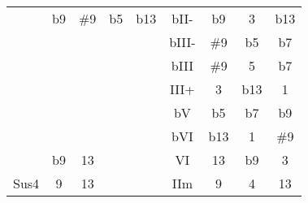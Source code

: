 \documentclass[10pt,a4paper]{article}
\begin{document}
\begin{table}[]
\begin{tabular}{ccccccccc}
\multicolumn{1}{|c|}{}                                 & \multicolumn{1}{c|}{b9} & \multicolumn{1}{c|}{\#9}  & \multicolumn{1}{c|}{b5} & \multicolumn{1}{c|}{b13} & \multicolumn{1}{c|}{bII-}                  & \multicolumn{1}{c|}{b9}  & \multicolumn{1}{c|}{3}    & \multicolumn{1}{c|}{b13}  \\ \cline{2-9} 
\multicolumn{1}{|c|}{}                                 & \multicolumn{1}{c|}{}   & \multicolumn{1}{c|}{}     & \multicolumn{1}{c|}{}   & \multicolumn{1}{c|}{}    & \multicolumn{1}{c|}{bIII-}                 & \multicolumn{1}{c|}{\#9} & \multicolumn{1}{c|}{b5}   & \multicolumn{1}{c|}{b7}   \\ \cline{2-9} 
\multicolumn{1}{|c|}{}                                 & \multicolumn{1}{c|}{}   & \multicolumn{1}{c|}{}     & \multicolumn{1}{c|}{}   & \multicolumn{1}{c|}{}    & \multicolumn{1}{c|}{bIII}                  & \multicolumn{1}{c|}{\#9} & \multicolumn{1}{c|}{5}    & \multicolumn{1}{c|}{b7}   \\ \cline{2-9} 
\multicolumn{1}{|c|}{}                                 & \multicolumn{1}{c|}{}   & \multicolumn{1}{c|}{}     & \multicolumn{1}{c|}{}   & \multicolumn{1}{c|}{}    & \multicolumn{1}{c|}{III+}                  & \multicolumn{1}{c|}{3}   & \multicolumn{1}{c|}{b13}  & \multicolumn{1}{c|}{1}    \\ \cline{2-9} 
\multicolumn{1}{|c|}{}                                 & \multicolumn{1}{c|}{}   & \multicolumn{1}{c|}{}     & \multicolumn{1}{c|}{}   & \multicolumn{1}{c|}{}    & \multicolumn{1}{c|}{bV}                    & \multicolumn{1}{c|}{b5}  & \multicolumn{1}{c|}{b7}   & \multicolumn{1}{c|}{b9}   \\ \cline{2-9} 
\multicolumn{1}{|c|}{}                                 & \multicolumn{1}{c|}{}   & \multicolumn{1}{c|}{}     & \multicolumn{1}{c|}{}   & \multicolumn{1}{c|}{}    & \multicolumn{1}{c|}{bVI}                   & \multicolumn{1}{c|}{b13} & \multicolumn{1}{c|}{1}    & \multicolumn{1}{c|}{\#9}  \\ \cline{2-9} 
\multicolumn{1}{|c|}{}                                 & \multicolumn{1}{c|}{b9} & \multicolumn{1}{c|}{13}   & \multicolumn{1}{c|}{}   & \multicolumn{1}{c|}{}    & \multicolumn{1}{c|}{VI}                    & \multicolumn{1}{c|}{13}  & \multicolumn{1}{c|}{b9}   & \multicolumn{1}{c|}{3}    \\ \hline
\multicolumn{1}{|c|}{\multirow{3}{*}{Sus4}}            & \multicolumn{1}{c|}{9}  & \multicolumn{1}{c|}{13}   & \multicolumn{1}{c|}{}   & \multicolumn{1}{c|}{}    & \multicolumn{1}{c|}{IIm}                   & \multicolumn{1}{c|}{9}   & \multicolumn{1}{c|}{4}    & \multicolumn{1}{c|}{13}   \\ \cline{2-9} 

\end{tabular}
\end{table}
\end{document}
